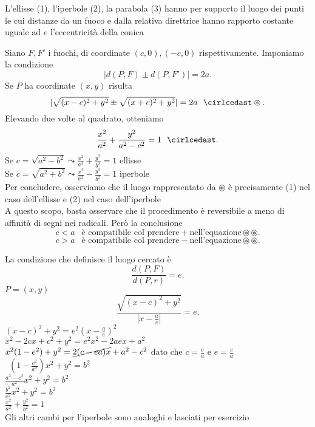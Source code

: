 \documentclass[12px]{article}
\begin{document}
\begin{prop}
	L'ellisse (1), l'iperbole (2), la parabola (3) hanno per supporto il luogo dei punti le cui distanze da un fuoco e dalla relativa direttrice hanno rapporto costante uguale ad $e$ l'eccentricità della conica
\end{prop}
\begin{dimo}[proposizione 1]
	Siano $F, F'$ i fuochi, di coordinate $(c,0),(-c,0)$ rispettivamente.
	Imponiamo la condizione
	\[
	|d(P,F)\pm d(P,F')| = 2a
	.\] 
	Se $P$ ha  coordinate $(x,y)$ risulta \[
		|\sqrt{(x-c)^2+y^2}\pm\sqrt{(x+c)^2 + y^2}| = 2a \ \ \cirlcedast\circledast
	.\] 
	Elevando due volte al quadrato, otteniamo 
	\[
		\frac{x^2}{a^2} + \frac{y^2}{a^2-c^2} = 1 \ \ \cirlcedast
	.\] 
	Se $c = \sqrt{a^2 - b^2} \leadsto \frac{x^2}{a^2} + \frac{y^2}{b^2} =1$ ellisse\\
	Se $c = \sqrt{a^2 + b^2} \leadsto \frac{x^2}{a^2} - \frac {y^2}{b^2} = 1$ iperbole\\
	Per concludere, osserviamo che il luogo rappresentato da $\circledast$ è precisamente (1) nel caso dell'ellisse e (2) nel caso dell'iperbole\\
	A questo scopo, basta osservare che il procedimento è reversibile a meno di affinità di segni nei radicali. Però la conclusione\\
	\[
		c < a \ \ \text{ è compatibile col prendere} + \text{nell'equazione} \circledast\circledast
	.\] 
	\[
		c > a \ \ \text{ è compatibile col prendere} - \text{nell'equazione} \circledast\circledast
	.\] 
\end{dimo}
\begin{dimo}[proposizione 2]
	La condizione che definisce il luogo cercato è 
	\[
		\frac{d(P,F)}{d(P,r)}=e
	.\] 
	$ P = (x,y)$
	 \[
		 \frac{\sqrt{(x-c)^2+y^2}}{|x-\frac{a}{c}|}=e
	.\] 
	$(x-c)^2 + y^2 = e^2 (x-\frac a e)^2$ \\
	$x^2 - 2cx + c^2 + y^2 = e^2x^2 - 2aex + a^2$\\
	$x^2 (1-e^2) + y^2 = \cancel{2(c - ea)x} + a^2 - c^2$ dato che $c = \frac e a$ e  $e = \frac c a$\\\
	$(1 - \frac {c^2}{a^2})x^2 + y^2 = b^2$ \\
	$\frac{a^2 - c^2}{a^2}x^2 + y^2 = b^2$\\
	$\frac{b^2}{e^2}x^2 + y^2 = b^2$\\
	$\frac{x^2}{a^2} + \frac{y^2}{b^2} = 1$\\
	Gli altri cambi per l'iperbole sono analoghi e lasciati per esercizio
\end{dimo}
\end{document}
